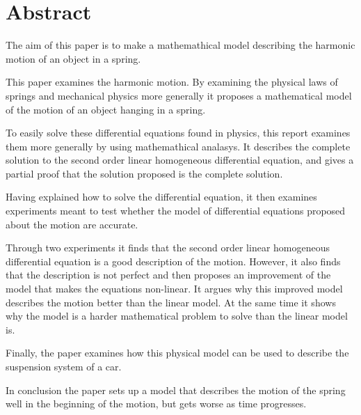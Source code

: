 \section*{Abstract}
\thispagestyle{plain}
The aim of this paper is to make a mathemathical model describing the harmonic motion of an object in a spring. 

This paper examines the harmonic motion. 
By examining the physical laws of springs and mechanical physics more generally it proposes a mathematical model of the motion of an object hanging in a spring.

To easily solve these differential equations found in physics, this report examines them more generally by using mathemathical analasys. 
It describes the complete solution to the second order linear homogeneous differential equation, and gives a partial proof that the solution proposed is the complete solution. 

Having explained how to solve the differential equation, it then examines experiments meant to test whether the model of differential equations proposed about the motion are accurate.

Through two experiments it finds that the second order linear homogeneous differential equation is a good description of the motion.
However, it also finds that the description is not perfect and then proposes an improvement of the model that makes the equations non-linear.
It argues why this improved model describes the motion better than the linear model.
At the same time it shows why the model is a harder mathematical problem to solve than the linear model is. 

Finally, the paper examines how this physical model can be used to describe the suspension system of a car.

In conclusion the paper sets up a model that describes the motion of the spring well in the beginning of the motion, but gets worse as time progresses. 

